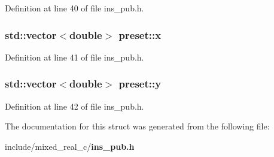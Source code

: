 Definition at line 40 of file ins\_\-pub.h.

\subsubsection[{x}]{\setlength{\rightskip}{0pt plus 5cm}std::vector$<$double$>$ {\bf preset::x}}\label{structpreset_aef23b44ccd60cc5d9c2b0d1ced9fdec2}


Definition at line 41 of file ins\_\-pub.h.

\subsubsection[{y}]{\setlength{\rightskip}{0pt plus 5cm}std::vector$<$double$>$ {\bf preset::y}}\label{structpreset_aa48b49f1a0af090015a83eb34e1ab2fa}


Definition at line 42 of file ins\_\-pub.h.



The documentation for this struct was generated from the following file:\begin{DoxyCompactItemize}
\item 
include/mixed\_\-real\_\-c/{\bf ins\_\-pub.h}\end{DoxyCompactItemize}
